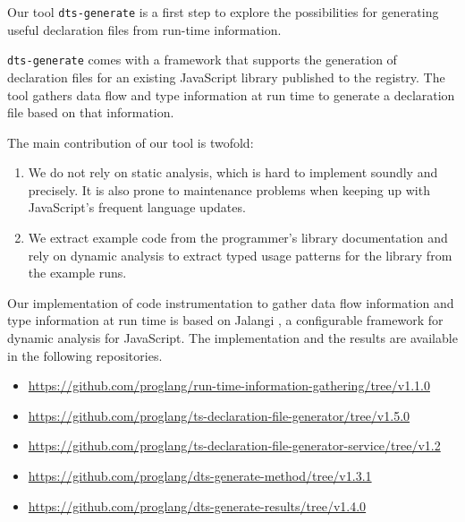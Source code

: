 \documentclass[sigplan,screen]{acmart}
\begin{document}
Our tool \texttt{dts-generate} is a first step to explore the possibilities for
generating useful declaration files from run-time information.

\texttt{dts-generate} comes with a framework that 
supports the generation of declaration files for an existing
JavaScript library published to the \NPM{} registry. The tool gathers
data flow and type information at run time to generate a declaration
file based on that information.

The main contribution of our tool is twofold:
\begin{enumerate}
\item
  We do not rely on static analysis, which is hard to implement
  soundly and precisely. It is also prone to maintenance problems
  when keeping up with JavaScript's frequent language updates.
\item
  We extract example code from the programmer's library
  documentation and rely on dynamic analysis to extract typed usage
  patterns for the library from the example runs.
\end{enumerate}


Our implementation of code instrumentation  to gather data flow
information and type information at run time is based on
Jalangi \cite{DBLP:conf/sigsoft/SenKBG13}, a configurable
framework for dynamic analysis for JavaScript.
The implementation and the results are available in the following repositories.

\begin{itemize}\footnotesize
  \item \url{https://github.com/proglang/run-time-information-gathering/tree/v1.1.0}
  \item \url{https://github.com/proglang/ts-declaration-file-generator/tree/v1.5.0}
  \item \url{https://github.com/proglang/ts-declaration-file-generator-service/tree/v1.2}
  \item \url{https://github.com/proglang/dts-generate-method/tree/v1.3.1}
  \item \url{https://github.com/proglang/dts-generate-results/tree/v1.4.0}
\end{itemize}
\end{document}
